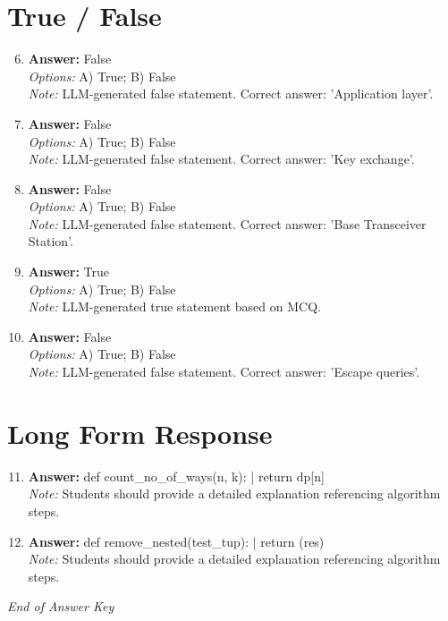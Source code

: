 \documentclass[12pt]{article}
\begin{document}
\section*{True / False}
\begin{enumerate}[label=\arabic*.]
\setcounter{enumi}{5}
\item \textbf{Answer:} False
\\ \textit{Options:} A) True; B) False
\\ \textit{Note:} LLM-generated false statement. Correct answer: 'Application layer'.
\item \textbf{Answer:} False
\\ \textit{Options:} A) True; B) False
\\ \textit{Note:} LLM-generated false statement. Correct answer: 'Key exchange'.
\item \textbf{Answer:} False
\\ \textit{Options:} A) True; B) False
\\ \textit{Note:} LLM-generated false statement. Correct answer: 'Base Transceiver Station'.
\item \textbf{Answer:} True
\\ \textit{Options:} A) True; B) False
\\ \textit{Note:} LLM-generated true statement based on MCQ.
\item \textbf{Answer:} False
\\ \textit{Options:} A) True; B) False
\\ \textit{Note:} LLM-generated false statement. Correct answer: 'Escape queries'.
\end{enumerate}

\section*{Long Form Response}
\begin{enumerate}[label=\arabic*.]
\setcounter{enumi}{10}
\item \textbf{Answer:} def count\_no\_of\_ways(n, k): | return dp[n]
\\ \textit{Note:} Students should provide a detailed explanation referencing algorithm steps.
\item \textbf{Answer:} def remove\_nested(test\_tup): | return (res)
\\ \textit{Note:} Students should provide a detailed explanation referencing algorithm steps.
\end{enumerate}

\vfill
\noindent\textit{End of Answer Key}
\end{document}
